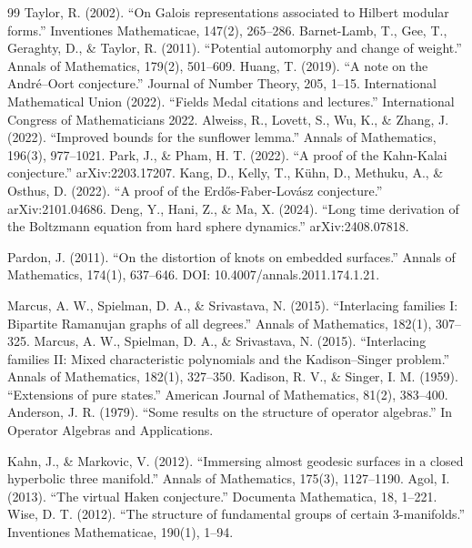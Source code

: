 \begin{thebibliography}{99}
 Taylor, R. (2002). ``On Galois representations associated to Hilbert modular forms.'' Inventiones Mathematicae, 147(2), 265--286.
 Barnet-Lamb, T., Gee, T., Geraghty, D., \& Taylor, R. (2011). ``Potential automorphy and change of weight.'' Annals of Mathematics, 179(2), 501--609.
 Huang, T. (2019). ``A note on the André--Oort conjecture.'' Journal of Number Theory, 205, 1--15.
 International Mathematical Union (2022). ``Fields Medal citations and lectures.'' International Congress of Mathematicians 2022.
 Alweiss, R., Lovett, S., Wu, K., \& Zhang, J. (2022). ``Improved bounds for the sunflower lemma.'' Annals of Mathematics, 196(3), 977--1021.
 Park, J., \& Pham, H. T. (2022). ``A proof of the Kahn-Kalai conjecture.'' arXiv:2203.17207.
 Kang, D., Kelly, T., K\"{u}hn, D., Methuku, A., \& Osthus, D. (2022). ``A proof of the Erdős-Faber-Lovász conjecture.'' arXiv:2101.04686.
 Deng, Y., Hani, Z., \& Ma, X. (2024). ``Long time derivation of the Boltzmann equation from hard sphere dynamics.'' arXiv:2408.07818.

 Pardon, J. (2011). ``On the distortion of knots on embedded surfaces.'' Annals of Mathematics, 174(1), 637--646. DOI: 10.4007/annals.2011.174.1.21.

 Marcus, A. W., Spielman, D. A., \& Srivastava, N. (2015). ``Interlacing families I: Bipartite Ramanujan graphs of all degrees.'' Annals of Mathematics, 182(1), 307--325.
 Marcus, A. W., Spielman, D. A., \& Srivastava, N. (2015). ``Interlacing families II: Mixed characteristic polynomials and the Kadison--Singer problem.'' Annals of Mathematics, 182(1), 327--350.
 Kadison, R. V., \& Singer, I. M. (1959). ``Extensions of pure states.'' American Journal of Mathematics, 81(2), 383--400.
 Anderson, J. R. (1979). ``Some results on the structure of operator algebras.'' In Operator Algebras and Applications.

 Kahn, J., \& Markovic, V. (2012). ``Immersing almost geodesic surfaces in a closed hyperbolic three manifold.'' Annals of Mathematics, 175(3), 1127--1190.
 Agol, I. (2013). ``The virtual Haken conjecture.'' Documenta Mathematica, 18, 1--221.
 Wise, D. T. (2012). ``The structure of fundamental groups of certain 3-manifolds.'' Inventiones Mathematicae, 190(1), 1--94.


\end{thebibliography}

